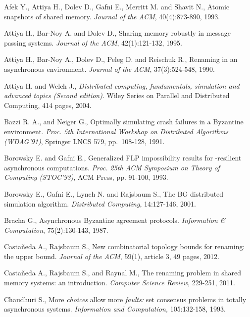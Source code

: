 \documentclass[11pt,letterpaper]{article}
\begin{document}
\begin{thebibliography}{99}
\footnotesize{
\setlength{\baselineskip}{1.03\baselineskip}

Afek Y., Attiya H., Dolev D., Gafni E., Merritt M. and Shavit N., 
Atomic snapshots of shared memory. 
{\em Journal of the  ACM}, 40(4):873-890, 1993.


Attiya H., Bar-Noy A. and Dolev D.,
 Sharing memory robustly in  message passing systems.
{\it Journal of the ACM}, 42(1):121-132, 1995.


Attiya H., Bar-Noy A., Dolev D., Peleg D. and Reischuk R.,
Renaming in an asynchronous environment.
{\it Journal of the ACM}, 37(3):524-548, 1990.

Attiya H. and Welch J.,
{\it Distributed computing, fundamentals, simulation and advanced topics
(Second edition)}.
Wiley Series on Parallel and Distributed Computing, 414 pages, 2004.

Bazzi R. A., and Neiger G.,
Optimally simulating crash failures in a Byzantine environment.
{\it Proc.  5th International Workshop on Distributed Algorithms (WDAG'91)},
Springer LNCS 579, pp.~108-128, 1991. 


Borowsky E. and Gafni E.,
Generalized FLP impossibility results for -resilient asynchronous
computations.
{\em Proc. 25th ACM  Symposium on Theory of Computing (STOC'93)},
ACM Press, pp. 91-100, 1993.

 Borowsky E.,  Gafni E., Lynch N.  and  Rajsbaum S.,
The BG distributed simulation algorithm.
{\em Distributed  Computing}, 14:127-146, 2001.

Bracha G.,
Asynchronous Byzantine agreement protocols.
{\it Information \& Computation}, 75(2):130-143, 1987.


Casta\~neda A., Rajsbaum S.,
New combinatorial topology bounds for renaming: the upper bound.
{\it Journal of the  ACM}, 59(1), article 3, 49 pages, 2012.


Casta\~neda A., Rajsbaum S., and Raynal M.,
The renaming problem in shared memory systems: an introduction.
{\it Computer Science Review}, 229-251, 2011.

Chaudhuri S.,
More {\em choices} allow more {\em faults:} set consensus
problems in totally asynchronous systems.
{\em Information and Computation,} 105:132-158, 1993.



}
\end{thebibliography}
\end{document}

